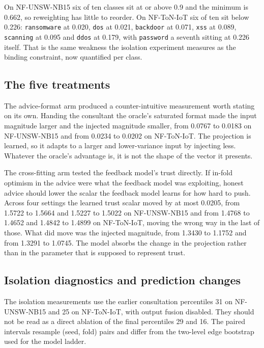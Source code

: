 On NF-UNSW-NB15 six of ten classes sit at or above 0.9 and the minimum is 0.662, so
reweighting has little to reorder. On NF-ToN-IoT six of ten sit below 0.226: \texttt{ransomware}
at 0.020, \texttt{dos} at 0.021, \texttt{backdoor} at 0.071, \texttt{xss} at 0.089,
\texttt{scanning} at 0.095 and \texttt{ddos} at 0.179, with \texttt{password} a seventh sitting
at 0.226 itself. That is the same weakness the isolation experiment measures as the binding
constraint, now quantified per class.

\FloatBarrier
\subsection{The five treatments}
\label{app:treatments}



The advice-format arm produced a counter-intuitive measurement worth stating on its own. Handing
the consultant the oracle's saturated format made the input magnitude larger and the injected
magnitude smaller, from 0.0767 to 0.0183 on NF-UNSW-NB15 and from 0.0234 to 0.0202 on
NF-ToN-IoT. The projection is learned, so it adapts to a larger and lower-variance input by
injecting less. Whatever the oracle's advantage is, it is not the shape of the vector it presents.

The cross-fitting arm tested the feedback model's trust directly. If in-fold optimism in the advice were
what the feedback model was exploiting, honest advice should lower the scalar the feedback model learns for how hard
to push. Across four settings the learned trust scalar moved by at most 0.0205, from 1.5722 to
1.5664 and 1.5227 to 1.5022 on NF-UNSW-NB15 and from 1.4768 to 1.4652 and 1.4842 to 1.4899 on
NF-ToN-IoT, moving the wrong way in the last of those. What did move was the injected magnitude,
from 1.3430 to 1.1752 and from 1.3291 to 1.0745. The model absorbs the change in the projection
rather than in the parameter that is supposed to represent trust.

\FloatBarrier
\subsection{Isolation diagnostics and prediction changes}
\label{app:isolation-detail}

The isolation measurements use the earlier consultation percentiles 31 on NF-UNSW-NB15 and 25 on NF-ToN-IoT, with output fusion disabled. They should not be read as a direct ablation of the final percentiles 29 and 16. The paired intervals resample (seed, fold) pairs and differ from the two-level edge bootstrap used for the model ladder.

